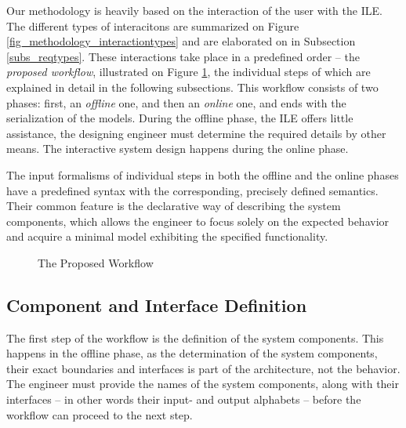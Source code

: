 Our methodology is heavily based on the interaction of the user with the ILE. The different types of interacitons are summarized on Figure \ref{fig_methodology_interactiontypes} and are elaborated on in Subsection \ref{subs_reqtypes}. These interactions take place in a predefined order -- the \textit{proposed workflow}, illustrated on Figure \ref{fig_methodology_workflow}, the individual steps of which are explained in detail in the following subsections. This workflow consists of two phases: first, an \textit{offline} one, and then an \textit{online} one, and ends with the serialization of the models. During the offline phase, the ILE offers little assistance, the designing engineer must determine the required details by other means. The interactive system design happens during the online phase. 

The input formalisms of individual steps in both the offline and the online phases have a predefined syntax with the corresponding, precisely defined semantics. Their common feature is the declarative way of describing the system components, which allows the engineer to focus solely on the expected behavior and acquire a minimal model exhibiting the specified functionality.

\begin{figure}[!ht] 
	\centering
	\caption{The Proposed Workflow}
	\label{fig_methodology_workflow}
\end{figure}

\subsection{Component and Interface Definition} \label{subs_compdef}
The first step of the workflow is the definition of the system components. This happens in the offline phase, as the determination of the system components, their exact boundaries and interfaces is part of the architecture, not the behavior. The engineer must provide the names of the system components, along with their interfaces -- in other words their input- and output alphabets -- before the workflow can proceed to the next step.

